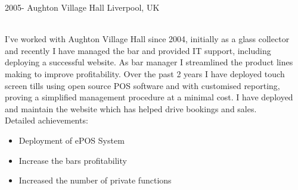 \documentclass[]{cv-style}          %
\begin{document}
\begin{entrylist}
\entry
  {2005-}
  {Aughton Village Hall}
  {Liverpool, UK}
  {\\{I've worked with Aughton Village Hall since 2004, initially as a glass collector and recently I have managed the bar and provided IT support, including deploying a successful website. As bar manager I streamlined the product lines making to improve profitability. Over the past 2 years I have deployed touch screen tills using open source POS software and with customised reporting, proving a simplified management procedure at a minimal cost. I have deployed and maintain the website which has helped drive bookings and sales.\\}
    Detailed achievements:
  \begin{itemize}
    \item Deployment of ePOS System
    \item Increase the bars profitability
    \item Increased the number of private functions 
  \end{itemize}
}
\end{entrylist}






\end{document}
